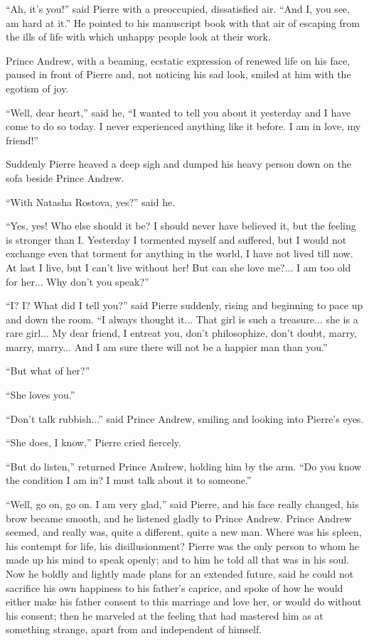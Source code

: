 ``Ah, it's you!'' said Pierre with a preoccupied, dissatisfied
air. ``And I, you see, am hard at it.'' He pointed to his
manuscript book with that air of escaping from the ills of life
with which unhappy people look at their work.

Prince Andrew, with a beaming, ecstatic expression of renewed
life on his face, paused in front of Pierre and, not noticing his
sad look, smiled at him with the egotism of joy.

``Well, dear heart,'' said he, ``I wanted to tell you about it
yesterday and I have come to do so today. I never experienced
anything like it before. I am in love, my friend!''

Suddenly Pierre heaved a deep sigh and dumped his heavy person
down on the sofa beside Prince Andrew.

``With Natasha Rostova, yes?'' said he.

``Yes, yes! Who else should it be? I should never have believed
it, but the feeling is stronger than I. Yesterday I tormented
myself and suffered, but I would not exchange even that torment
for anything in the world, I have not lived till now. At last I
live, but I can't live without her! But can she love me?... I am
too old for her... Why don't you speak?''

``I? I? What did I tell you?'' said Pierre suddenly, rising and
beginning to pace up and down the room. ``I always thought
it... That girl is such a treasure... she is a rare girl... My
dear friend, I entreat you, don't philosophize, don't doubt,
marry, marry, marry... And I am sure there will not be a happier
man than you.''

``But what of her?''

``She loves you.''

``Don't talk rubbish...'' said Prince Andrew, smiling and looking
into Pierre's eyes.

``She does, I know,'' Pierre cried fiercely.

``But do listen,'' returned Prince Andrew, holding him by the
arm. ``Do you know the condition I am in? I must talk about it to
someone.''

``Well, go on, go on. I am very glad,'' said Pierre, and his face
really changed, his brow became smooth, and he listened gladly to
Prince Andrew. Prince Andrew seemed, and really was, quite a
different, quite a new man. Where was his spleen, his contempt
for life, his disillusionment? Pierre was the only person to whom
he made up his mind to speak openly; and to him he told all that
was in his soul. Now he boldly and lightly made plans for an
extended future, said he could not sacrifice his own happiness to
his father's caprice, and spoke of how he would either make his
father consent to this marriage and love her, or would do without
his consent; then he marveled at the feeling that had mastered
him as at something strange, apart from and independent of
himself.

